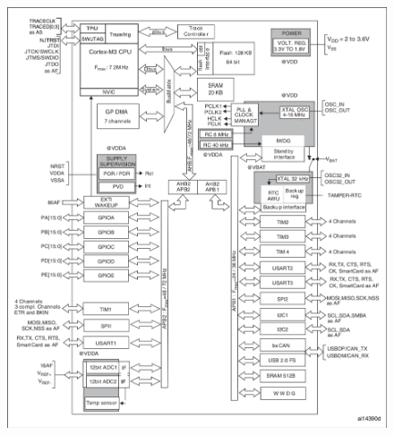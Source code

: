 		\begin{figure}[!b]
			\includegraphics[width=\textwidth]{images/content/clockDiag.png}
			\label{fig:clockDiag}
		\end{figure}
	
